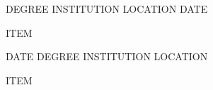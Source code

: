 
\begin{cventries}
	\cventry
	{DEGREE} %
	{INSTITUTION} %
	{LOCATION} %
	{DATE} %
	{
		\begin{cvitems} %
			\item {ITEM}
		\end{cvitems}
	}
	\cventry
	{DATE} %
	{DEGREE} %
	{INSTITUTION} %
	{LOCATION} %
	{
		\begin{cvitems} %
			\item {ITEM}
		\end{cvitems}
	}
\end{cventries}